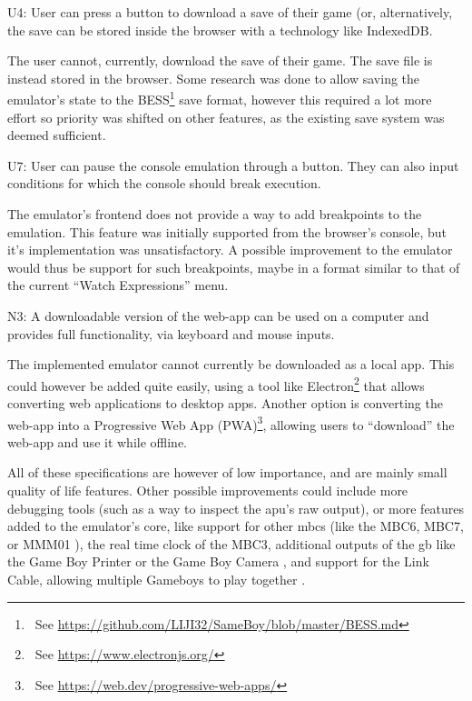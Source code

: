 \documentclass[11pt]{informatics-report}
\newcommand{\ftnt}[1]{\footnote{~See \url{#1}}}
\begin{document}
\begin{compactitem}
	\item
		U4: User can press a button to download a save of their game (or, alternatively, the save can be stored inside the browser with a technology like IndexedDB.

		The user cannot, currently, download the save of their game. The save file is instead stored in the browser. Some research was done to allow saving the emulator's state to the BESS\ftnt{https://github.com/LIJI32/SameBoy/blob/master/BESS.md} save format, however this required a lot more effort so priority was shifted on other features, as the existing save system was deemed sufficient.

	\item
		U7: User can pause the console emulation through a button. They can also input conditions for which the console should break execution.

		The emulator's frontend does not provide a way to add breakpoints to the emulation. This feature was initially supported from the browser's console, but it's implementation was unsatisfactory. A possible improvement to the emulator would thus be support for such breakpoints, maybe in a format similar to that of the current ``Watch Expressions'' menu.

	\item
		N3: A  downloadable version of the web-app can be used on a computer and provides full functionality, via keyboard and mouse inputs.

		The implemented emulator cannot currently be downloaded as a local app. This could however be added quite easily, using a tool like Electron\ftnt{https://www.electronjs.org/} that allows converting web applications to desktop apps. Another option is converting the web-app into a Progressive Web App (PWA)\ftnt{https://web.dev/progressive-web-apps/}, allowing users to ``download'' the web-app and use it while offline.
\end{compactitem}

All of these specifications are however of low importance, and are mainly small quality of life features. Other possible improvements could include more debugging tools (such as a way to inspect the \gls{apu}'s raw output), or more features added to the emulator's core, like support for other \glspl{mbc} (like the MBC6, MBC7, or MMM01 \cite[MBCs]{pandoc}), the real time clock of the MBC3, additional outputs of the \gls{gb} like the Game Boy Printer or the Game Boy Camera \cite{pandoc}, and support for the Link Cable, allowing multiple Gameboys to play together \cite[Serial Data Transfer]{pandoc}.
\end{document}
